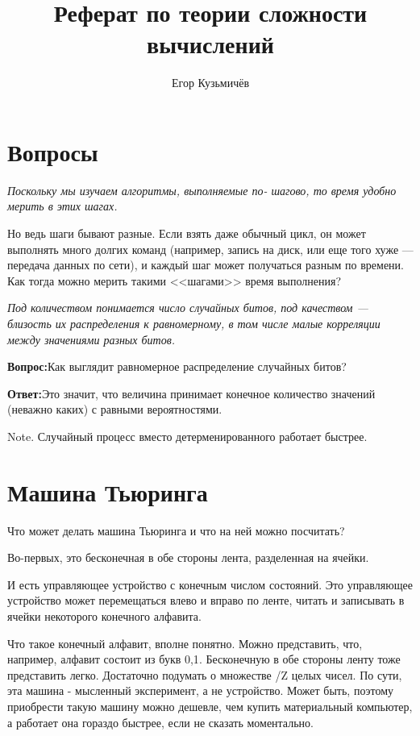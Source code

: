 \documentclass{article}
\title{Реферат по теории сложности вычислений}
\author{Егор Кузьмичёв}
\newcommand{\qu}{\textbf{Вопрос:}}
\newcommand{\an}{\textbf{Ответ:}}
\begin{document}
\maketitle

\tableofcontents

\section{Вопросы}

\textit{Поскольку мы изучаем алгоритмы, выполняемые по- шагово, то время удобно мерить в этих шагах.}

Но ведь шаги бывают разные. Если взять даже обычный цикл, он может выполнять много долгих команд (например, запись на диск, или еще того хуже --- передача данных по сети), и каждый шаг может получаться разным по времени. Как тогда можно мерить такими <<шагами>> время выполнения?

\textit{Под количеством понимается число случайных битов, под качеством --- близость их распределения к равномерному, в том числе малые корреляции между значениями разных битов.}

\qu Как выглядит равномерное распределение случайных битов?

\an Это значит, что величина принимает конечное количество значений (неважно каких) с равными вероятностями.


Note. Случайный процесс вместо детерменированного работает быстрее.

\section{Машина Тьюринга}
Что может делать машина Тьюринга и что на ней можно посчитать?

Во-первых, это бесконечная в обе стороны лента, разделенная на ячейки.

И есть управляющее устройство с конечным числом состояний. 
Это управляющее устройство может перемещаться влево и вправо по ленте, читать и записывать в ячейки некоторого конечного алфавита.

Что такое конечный алфавит, вполне понятно. Можно представить, что, например, алфавит состоит из букв {0,1}. 
Бесконечную в обе стороны ленту тоже представить легко. Достаточно подумать о множестве /Z целых чисел.
По сути, эта машина - мысленный эксперимент, а не устройство. 
Может быть, поэтому приобрести такую машину можно дешевле, чем купить материальный компьютер, а работает она гораздо быстрее, если не сказать моментально.
\end{document}

